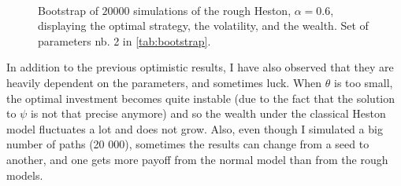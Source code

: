 \begin{figure}[h]
\centering
{}
\\
\caption{Bootstrap of $20000$ simulations of the rough Heston, $\alpha = 0.6 $, displaying the optimal strategy, the volatility, and the wealth. Set of parameters nb. 2 in \ref{tab:bootstrap}.}
\label{fig:bootstraprough2}
\end{figure}


\begin{remarque}
In addition to the previous optimistic results, I have also observed that they are heavily dependent on the parameters, and sometimes luck. When $\theta$ is too small, the optimal investment becomes quite instable (due to the fact that the solution to $\psi$ is not that precise anymore) and so the wealth under the classical Heston model fluctuates a lot and does not grow. Also, even though I simulated a big number of paths (20 000), sometimes the results can change from a seed to another, and one gets more payoff from the normal model than from the rough models. 
\end{remarque}

